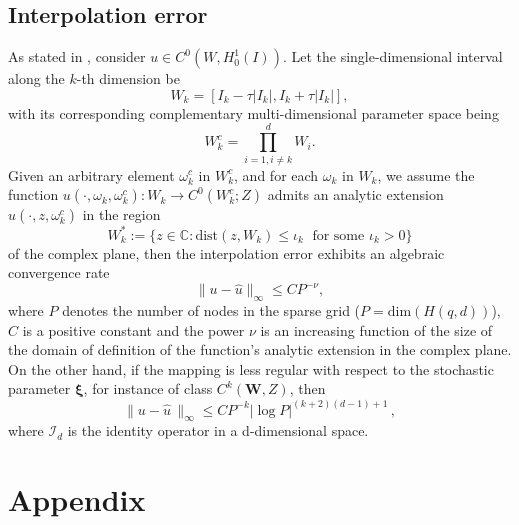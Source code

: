 \documentclass[final,3p,times,11pt]{elsarticle}
\begin{document}
\subsection{Interpolation error}
As stated in \cite{NoTeWe:2008,TeJaWe:2015}, consider $u \in C^0(W,H_0^1(I))$. Let the single-dimensional interval along the $k$-th dimension be 
\[
W_k = \left[I_k-\tau \left\vert I_k\right\vert, I_k+\tau \left\vert I_k\right\vert\right],
\]
with its corresponding complementary multi-dimensional parameter space being 
\[
W_k^c = \prod_{i=1, i\neq k}^d W_i.
\]
Given an arbitrary element $\omega_k^c$ in $W_k^c$, and for each $\omega_k$ in $W_k$, we assume the function $u(\cdot,\omega_k,\omega_k^c): W_k \rightarrow C^0(W_k^c;Z)$ admits an analytic extension  $u(\cdot, z,\omega_k^c)$ in the region 
\[
W_k^{*}:=\{z\in \mathbb{C}: \text{dist} (z,W_k)\le \iota_k \;\text{ for some } \iota_k>0\}
\]
of the complex plane, then the interpolation error exhibits an algebraic convergence rate
%
\begin{equation} \label{eq:coll-error-bound_2}
  \big\|u-\widehat{u}\big\|_\infty \le C P^{-\nu},
\end{equation}
%
where $P$ denotes the number of nodes in the sparse grid ($P=\text{dim}(H(q,d))$), $C$ is a positive constant and the power $\nu$ is an increasing function of the size of the domain of definition of the function's analytic extension in the complex plane. On the other hand, if the mapping is less regular with respect to the stochastic parameter $\boldsymbol\xi$, for instance of class $C^k(\boldsymbol W,Z)$, then \cite[Theorem~8]{BaNoRi:2000}
\begin{equation}
\label{eq:coll-error-bound-2}
  \big\|u-\widehat{u}\,\big\|_\infty \leq C P^{-k} |\log P|^{(k+2)(d-1)+1}\,,
\end{equation}
where $\mathcal{I}_d$ is the identity operator in a d-dimensional space.

\section{Appendix}\label{sec:Appendix}





\end{document}
